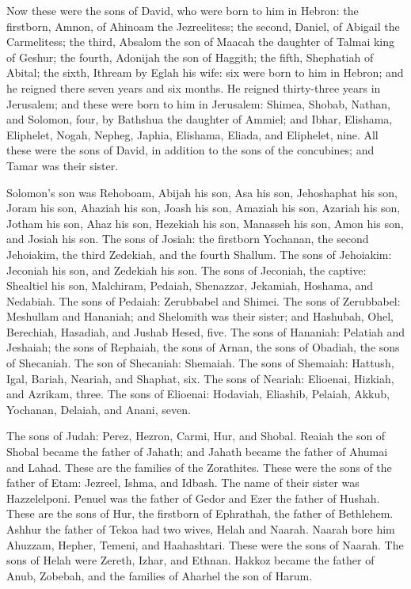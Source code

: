\mychapter{} \myverse*{}Now these were the sons of David, who were born to him in Hebron:
the firstborn, Amnon, of Ahinoam the Jezreelitess; the second, Daniel, of Abigail the Carmelitess;
\myverse{}the third, Absalom the son of Maacah the daughter of Talmai king of Geshur;
the fourth, Adonijah the son of Haggith;
\myverse{}the fifth, Shephatiah of Abital; the sixth, Ithream by Eglah his wife:
\myverse{}six were born to him in Hebron; and he reigned there seven years and six months.
He reigned thirty-three years in Jerusalem;
\myverse{}and these were born to him in Jerusalem: Shimea, Shobab, Nathan, and Solomon,
four, by Bathshua the daughter of Ammiel;
\myverse{}and Ibhar, Elishama, Eliphelet,
\myverse{}Nogah, Nepheg, Japhia,
\myverse{}Elishama, Eliada, and Eliphelet, nine.
\myverse{}All these were the sons of David, in addition to the sons of the concubines;
and Tamar was their sister.

\myverse{}Solomon’s son was Rehoboam, Abijah his son, Asa his son, Jehoshaphat
his son,
\myverse{}Joram his son, Ahaziah his son, Joash his son,
\myverse{}Amaziah his son, Azariah his son, Jotham his son,
\myverse{}Ahaz his son, Hezekiah his son, Manasseh his son,
\myverse{}Amon his son, and Josiah his son.
\myverse{}The sons of Josiah: the firstborn Yochanan, the second Jehoiakim, the third
Zedekiah, and the fourth Shallum.
\myverse{}The sons of Jehoiakim: Jeconiah his son, and Zedekiah his son.
\myverse{}The sons of Jeconiah, the captive: Shealtiel his son,
\myverse{}Malchiram, Pedaiah, Shenazzar, Jekamiah, Hoshama, and Nedabiah.
\myverse{}The sons of Pedaiah: Zerubbabel and Shimei. The sons of Zerubbabel: Meshullam
and Hananiah; and Shelomith was their sister;
\myverse{}and Hashubah, Ohel, Berechiah, Hasadiah, and Jushab Hesed, five.
\myverse{}The sons of Hananiah: Pelatiah and Jeshaiah; the sons of Rephaiah, the sons
of Arnan, the sons of Obadiah, the sons of Shecaniah.
\myverse{}The son of Shecaniah: Shemaiah. The sons of Shemaiah: Hattush, Igal, Bariah,
Neariah, and Shaphat, six.
\myverse{}The sons of Neariah: Elioenai, Hizkiah, and Azrikam, three.
\myverse{}The sons of Elioenai: Hodaviah, Eliashib, Pelaiah, Akkub, Yochanan, Delaiah,
and Anani, seven.


\mychapter{} \myverse*{}The sons of Judah: Perez, Hezron, Carmi, Hur, and Shobal.
\myverse{}Reaiah the son of Shobal became the father of Jahath; and Jahath became the
father of Ahumai and Lahad. These are the families of the Zorathites.
\myverse{}These were the sons of the father of Etam: Jezreel, Ishma, and Idbash. The name
of their sister was Hazzelelponi.
\myverse{}Penuel was the father of Gedor and Ezer the father of Hushah. These are the
sons of Hur, the firstborn of Ephrathah, the father of Bethlehem.
\myverse{}Ashhur the father of Tekoa had two wives, Helah and Naarah.
\myverse{}Naarah bore him Ahuzzam, Hepher, Temeni, and Haahashtari. These were the sons
of Naarah.
\myverse{}The sons of Helah were Zereth, Izhar, and Ethnan.
\myverse{}Hakkoz became the father of Anub, Zobebah, and the families of Aharhel the son
of Harum.

